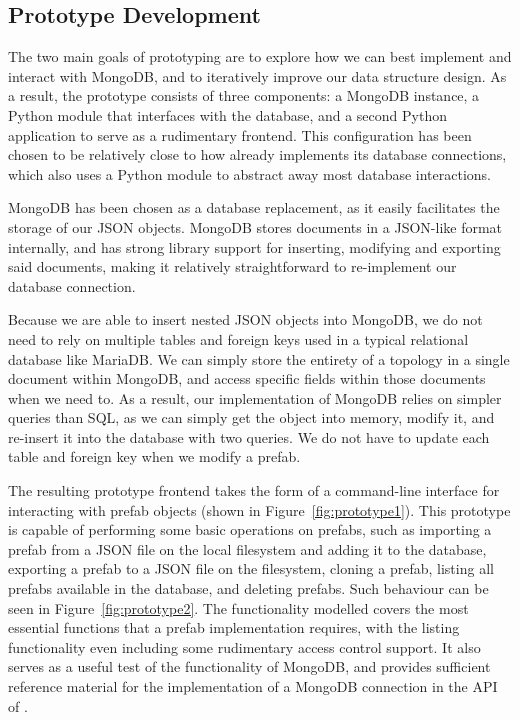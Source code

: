 \documentclass[11pt]{article}
\begin{document}
	
	\subsection{Prototype Development}
		The two main goals of prototyping are to explore how we can best implement and interact with MongoDB, and to iteratively improve our data structure design.
		As a result, the prototype consists of three components: a MongoDB instance, a Python module that interfaces with the database, and a second Python application to serve as a rudimentary frontend. 
		This configuration has been chosen to be relatively close to how \opendc{} already implements its database connections, which also uses a Python module to abstract away most database interactions.

		MongoDB has been chosen as a database replacement, as it easily facilitates the storage of our JSON objects.
		MongoDB stores documents in a JSON-like format internally, and has strong library support for inserting, modifying and exporting said documents, making it relatively straightforward to re-implement our database connection.

		Because we are able to insert nested JSON objects into MongoDB, we do not need to rely on multiple tables and foreign keys used in a typical relational database like MariaDB.
		We can simply store the entirety of a topology in a single document within MongoDB, and access specific fields within those documents when we need to.
		As a result, our implementation of MongoDB relies on simpler queries than SQL, as we can simply get the object into memory, modify it, and re-insert it into the database with two queries.
		We do not have to update each table and foreign key when we modify a prefab.

		The resulting prototype frontend takes the form of a command-line interface for interacting with prefab objects (shown in Figure~\ref{fig:prototype1}).
		This prototype is capable of performing some basic operations on prefabs, such as importing a prefab from a JSON file on the local filesystem and adding it to the database, exporting a prefab to a JSON file on the filesystem, cloning a prefab, listing all prefabs available in the database, and deleting prefabs.
		Such behaviour can be seen in Figure~\ref{fig:prototype2}.
		The functionality modelled covers the most essential functions that a prefab implementation requires, with the listing functionality even including some rudimentary access control support.
		It also serves as a useful test of the functionality of MongoDB, and provides sufficient reference material for the implementation of a MongoDB connection in the API of \opendc{}.
\end{document}
